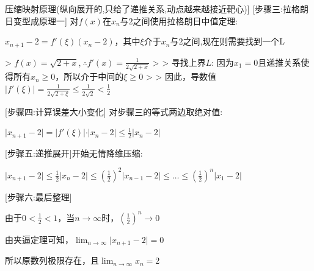 \documentclass[11pt,a4paper,UTF8]{ctexart}
\begin{document}
\begin{thmbox}[[4]压缩映射原理(纵向展开的,只给了递推关系,动点越来越接近靶心)]
[步骤三:拉格朗日变型成原理一] 对$f(x)$在$x_n$与$2$之间使用拉格朗日中值定理:

  $x_{n+1} - 2 = f'(\xi)(x_n - 2)$，其中$\xi$介于$x_n$与$2$之间,现在则需要找到一个L

  >   $f(x) = \sqrt{2 + x}$,$\ \therefore f'(x) = \frac{1}{2\sqrt{2 + x}}$
  >
  >   寻找上界$L$: 因为$x_1 = 0$且递推关系使得所有$x_n \ge 0$，所以介于中间的$\xi \ge 0$
  >
  >   因此，导数值$\vert{}f'(\xi)\vert{} = \frac{1}{2\sqrt{2 + \xi}} \le \frac{1}{2\sqrt{2}} < \frac{1}{2}$

[步骤四:计算误差大小变化] 对步骤三的等式两边取绝对值:

  $\vert{}x_{n+1} - 2\vert{} = \vert{}f'(\xi)\vert{} \cdot \vert{}x_n - 2\vert{} \le \frac{1}{2}\vert{}x_n - 2\vert{}$

[步骤五:递推展开]开始无情降维压缩:

  $\vert{}x_{n+1} - 2\vert{} \le \frac{1}{2}\vert{}x_n - 2\vert{} \le (\frac{1}{2})^2\vert{}x_{n-1} - 2\vert{} \le \dots \le (\frac{1}{2})^n\vert{}x_1 - 2\vert{}$

[步骤六:最后整理]

  由于$0 < \frac{1}{2} < 1$，当$n \to \infty$时，$(\frac{1}{2})^n \to 0$

  由夹逼定理可知，$\lim_{n \to \infty} \vert{}x_{n+1} - 2\vert{} = 0$

  所以原数列极限存在，且$\lim_{n \to \infty} x_n = 2$

\end{thmbox}
\end{document}
